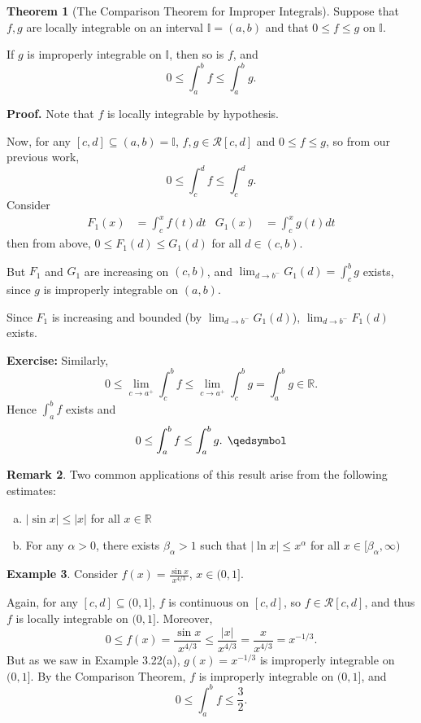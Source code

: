 \documentclass[11pt]{article}
\theoremstyle{definition}
\newtheorem{thm}{Theorem}[section]
\newtheorem{exmp}[thm]{Example}
\newtheorem{remark}[thm]{Remark}
\newcommand{\mbR}{\ensuremath{\mathbb{R}}}
\begin{document}
\begin{thm}[The Comparison Theorem for Improper Integrals]
Suppose that $f, g$ are locally integrable on an interval $\mathbb{I} = (a, b)$ and that $0 \leq f \leq g$ on $\mathbb{I}$. 

If $g$ is improperly integrable on $\mathbb{I}$, then so is $f$, and
$$0 \leq \int_a^b f \leq \int_a^b g \text{.}$$
\end{thm}
\textbf{Proof.} 
Note that $f$ is locally integrable by hypothesis. 

Now, for any $[c, d] \subseteq (a, b) = \mathbb{I}$, $f, g \in \mathcal{R}[c, d]$ and $0 \leq f \leq g$, so from our previous work,
$$0 \leq \int_c^d f \leq \int_c^d g \text{.}$$
Consider
\begin{align*}
F_1(x) & = \int_c^x f(t)dt & G_1(x) & = \int_c^x g(t)dt
\end{align*}
then from above, $0 \leq F_1(d) \leq G_1(d)$ for all $d \in (c, b)$. 

But $F_1$ and $G_1$ are increasing on $(c, b)$, and $\lim_{d\to b^-} G_1(d) = \int_c^b g$ exists, since $g$ is improperly integrable on $(a, b)$. 

Since $F_1$ is increasing and bounded (by $\lim_{d\to b^-} G_1(d)$), $\lim_{d\to b^-} F_1(d)$ exists. 

\textbf{Exercise:} Similarly,
$$0 \leq \lim_{c\to a^+} \int_c^b f \leq \lim_{c\to a^+} \int_c^b g = \int_a^b g \in \mbR \text{.}$$
Hence $\int_a^b f$ exists and
$$0 \leq \int_a^b f \leq \int_a^b g \text{. } \qedsymbol$$

\begin{remark}
Two common applications of this result arise from the following estimates:
\begin{enumerate}[(a)] \vspace{-0.2cm}
\item $|\sin x| \leq |x|$ for all $x \in \mbR$
\item For any $\alpha > 0$, there exists $\beta_{\alpha} > 1$ such that $|\ln x| \leq x^{\alpha}$ for all $x \in [\beta_{\alpha}, \infty)$
\end{enumerate}
\end{remark}

\begin{exmp}
Consider $f(x) = \frac{\sin x}{x^{4/3}}$, $x \in (0, 1]$. 

Again, for any $[c, d] \subseteq (0, 1]$, $f$ is continuous on $[c, d]$, so $f \in \mathcal{R}[c, d]$, and thus $f$ is locally integrable on $(0, 1]$. Moreover,
$$0 \leq f(x) = \frac{\sin x}{x^{4/3}} \leq \frac{|x|}{x^{4/3}} = \frac{x}{x^{4/3}} = x^{-1/3} \text{.}$$
But as we saw in Example 3.22(a), $g(x) = x^{-1/3}$ is improperly integrable on $(0, 1]$. By the Comparison Theorem, $f$ is improperly integrable on $(0, 1]$, and
$$0 \leq \int_a^b f \leq \frac32 \text{.}$$
\end{exmp}
\end{document}
